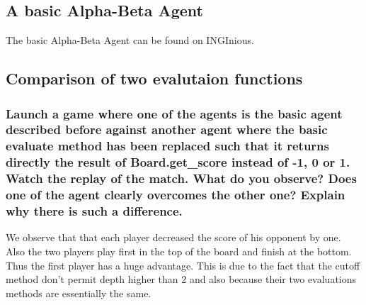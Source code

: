 \documentclass[10pt,a4paper]{article}
\begin{document}
\subsection{A basic Alpha-Beta Agent}

The basic Alpha-Beta Agent can be found on INGInious.

\subsection{Comparison of two evalutaion functions}

\subsubsection{Launch a game where one of the agents is the basic agent described before against another agent where the basic evaluate method has been replaced such that it returns directly the result of Board.get\_score instead of -1, 0 or 1. Watch the replay of the match. What do you observe? Does one of the agent clearly overcomes the other one? Explain why there is such a difference.}

We observe that that each player decreased the score of his opponent by one. Also the two players play first in the top of the board and finish at the bottom. Thus the first player has a huge advantage. This is due to the fact that the cutoff method don't permit depth higher than 2 and also because their two evaluations methods are essentially the same.
\end{document}
